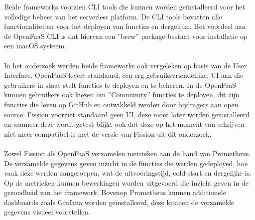 \documentclass[a0,portrait]{a0poster}
\begin{document}
\begin{multicols}{2}
Beide frameworks voorzien CLI tools die kunnen worden geïnstalleerd voor het volledige beheer van het serverless platform. De CLI tools bevatten alle functionaliteiten voor het deployen van functies en dergelijke. Het voordeel aan de OpenFaaS CLI is dat hiervan een ''brew'' package bestaat voor installatie op een macOS systeem.
\\\\
In het onderzoek werden beide frameworks ook vergeleken op basis van de User Interface. OpenFaaS levert standaard, een erg gebruiksvriendelijke, UI aan die gebruikers in staat stelt functies te deployen en te beheren. In de OpenFaaS kunnen gebruikers ook kiezen om ''Community'' functies te deployen, dit zijn functies die leven op GitHub en ontwikkeld werden door bijdragers aan open source. Fission voorziet standaard geen UI, deze moet later worden geïnstalleerd en wanneer deze wordt getest blijkt ook dat deze op het moment van schrijven niet meer compatibel is met de versie van Fission uit dit onderzoek. 
\\\\
Zowel Fission als OpenFaaS verzamelen metrieken aan de hand van Prometheus. De verzamelde gegevens geven inzicht in de functies die werden gedeployed, hoe vaak deze werden aangeroepen, wat de uitvoeringstijd, cold-start en dergelijke is. Op de metrieken kunnen bewerkingen worden uitgevoerd die inzicht geven in de gezondheid van het framework. Bovenop Prometheus kunnen additionele dashboards zoals Grafana worden geïnstalleerd, deze kunnen de verzamelde gegevens visueel voorstellen.



\color{HoGentAccent1} 

\end{multicols}
\end{document}
